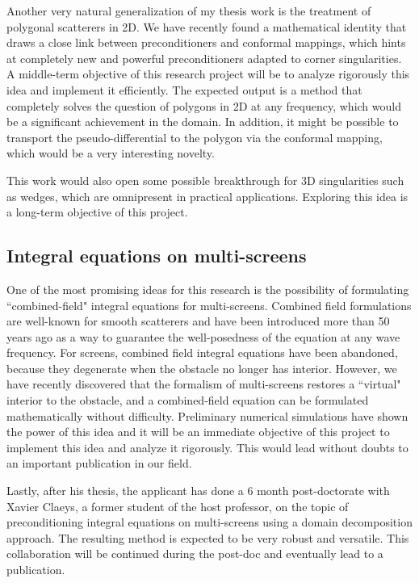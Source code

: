\documentclass[]{article}
\begin{document}
Another very natural generalization of my thesis work is the treatment of polygonal scatterers in 2D. We have recently found a mathematical identity that draws a close link between preconditioners and conformal mappings, which hints at completely new and powerful preconditioners adapted to corner singularities. A middle-term objective of this research project will be to analyze rigorously this idea and implement it efficiently. The expected output is a method that completely solves the question of polygons in 2D at any frequency, which would be a significant achievement in the domain. In addition, it might be possible to transport the pseudo-differential to the polygon via the conformal mapping, which would be a very interesting novelty. 

This work would also open some possible breakthrough for 3D singularities such as wedges, which are omnipresent in practical applications. Exploring this idea is a long-term objective of this project.


\subsection*{Integral equations on multi-screens}

One of the most promising ideas for this research is the possibility of formulating ``combined-field" integral equations for multi-screens. Combined field formulations are well-known for smooth scatterers and have been introduced more than 50 years ago \cite{brakhage1965dirichletsehe} as a way to guarantee the well-posedness of the equation at any wave frequency. For screens, combined field integral equations have been abandoned, because they degenerate when the obstacle no longer has interior. 
However, we have recently discovered that the formalism of multi-screens restores a ``virtual" interior to the obstacle, and a combined-field equation can be formulated mathematically without difficulty. Preliminary numerical simulations have shown the power of this idea and it will be an immediate objective of this project to implement this idea and analyze it rigorously. This would lead without doubts to an important publication in our field. 

Lastly, after his thesis, the applicant has done a 6 month post-doctorate with Xavier Claeys, a former student of the host professor, on the topic of preconditioning integral equations on multi-screens using a domain decomposition approach. The resulting method is expected to be very robust and versatile. This collaboration will be continued during the post-doc and eventually lead to a publication. 
\end{document}
